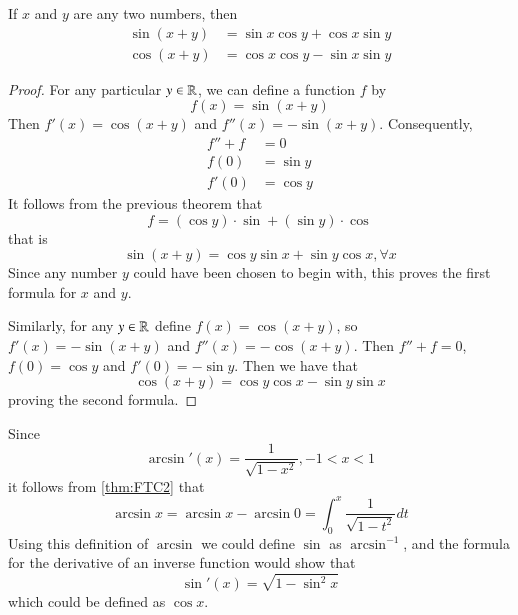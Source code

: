 \begin{subappendices}
    \begin{thm}
        If $x$ and $y$ are any two numbers, then \begin{align*}
            \sin(x+y) &= \sin x\cos y + \cos x \sin y \\
            \cos(x+y) &= \cos x\cos y - \sin x \sin y
        \end{align*}
    \end{thm}
    \begin{proof}
        For any particular $y \in \mathbb R$, we can define a function $f$ by \begin{equation*}
            f(x) = \sin(x+y)
        \end{equation*}
        Then $f'(x) = \cos(x+y)$ and $f''(x) = -\sin(x+y)$. Consequently, \begin{align*}
            f'' + f &= 0 \\
            f(0) &= \sin y \\
            f'(0) &= \cos y
        \end{align*}
        It follows from the previous theorem that \begin{equation*}
            f = (\cos y)\cdot \sin + (\sin y) \cdot \cos
        \end{equation*}
        that is \begin{equation*}
            \sin(x+y) = \cos y\sin x+\sin y \cos x,\forall x
        \end{equation*}
        Since any number $y$ could have been chosen to begin with, this proves the first formula for $x$ and $y$.


        Similarly, for any $y \in \mathbb R$ define $f(x) = \cos(x+y)$, so $f'(x) = -\sin(x+y)$ and $f''(x) = -\cos(x+y)$. Then $f'' + f = 0$, $f(0) = \cos y$ and $f'(0) = -\sin y$. Then we have that \begin{equation*}
            \cos(x+y) = \cos y\cos x - \sin y \sin x
        \end{equation*}
        proving the second formula.
    \end{proof}

    \begin{rmk}
        Since \begin{equation*}
            \arcsin'(x) = \frac{1}{\sqrt{1-x^2}}, -1 < x < 1
        \end{equation*}
        it follows from \ref{thm:FTC2} that \begin{equation*}
            \arcsin x = \arcsin x - \arcsin 0 = \int_0^x\frac{1}{\sqrt{1-t^2}}dt
        \end{equation*}
        Using this definition of $\arcsin$ we could define $\sin$ as $\arcsin^{-1}$, and the formula for the derivative of an inverse function would show that \begin{equation*}
            \sin'(x) = \sqrt{1-\sin^2 x}
        \end{equation*}
        which could be defined as $\cos x$.
    \end{rmk}



\end{subappendices}
